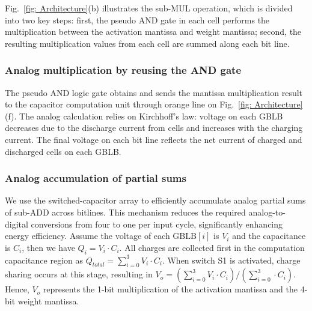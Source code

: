 Fig.{~\ref{fig: Architecture}}(b) illustrates the sub-MUL operation, which is divided into two key steps: first, the pseudo AND gate in each cell performs the multiplication between the activation mantissa and weight mantissa; second, the resulting multiplication values from each cell are summed along each bit line.


\subsubsection{Analog multiplication by reusing the AND gate}
The pseudo AND logic gate obtains and sends the mantissa multiplication result to the capacitor computation unit through orange line on Fig.~\ref{fig: Architecture}(f). 
The analog calculation relies on Kirchhoff’s law: voltage on each GBLB decreases due to the discharge current from cells and increases with the charging current. The final voltage on each bit line reflects the net current of charged and discharged cells on each GBLB.


\subsubsection{Analog accumulation of partial sums}

We use the switched-capacitor array to efficiently accumulate analog partial sums of sub-ADD across bitlines.
This mechanism reduces the required analog-to-digital conversions from four to one per input cycle, significantly enhancing energy efficiency.
Assume the voltage of each $\text{GBLB}[i]$ is $V_i$ and the capacitance is $C_i$, then we have $Q_i= V_i \cdot C_i$.
All charges are collected first in the computation capacitance region as $Q_{total} =\sum_{i=0}^{3} V_i \cdot C_i$.
When switch S1 is activated, charge sharing occurs at this stage, resulting in $V_{o} =({\sum_{i=0}^{3} V_i \cdot C_i})/({\sum_{i=0}^{3} \cdot C_i})$.
Hence, $V_o$  represents the 1-bit multiplication of the activation mantissa and the 4-bit weight mantissa.
\iffalse
The final result is given by the formula:
\begin{equation}
\sum_{n=0}^{3}V_{o,n}=\sum_{n=0}^{3} \sum_{x=0}^{3} 2^m \cdot X_n[m] \cdot M_n.
\end{equation}
\fi


